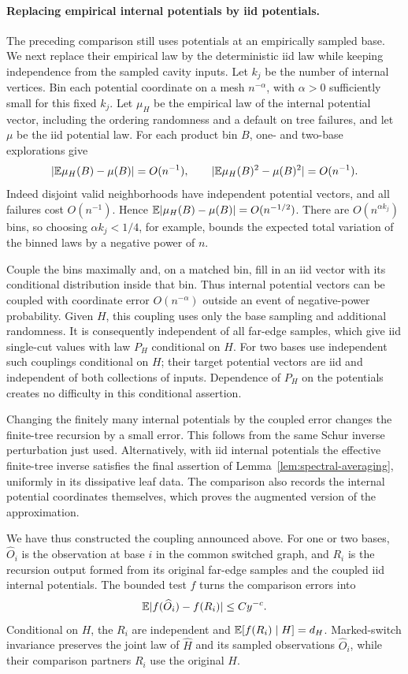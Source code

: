 \paragraph{Replacing empirical internal potentials by iid potentials.}
The preceding comparison still uses potentials at an empirically
sampled base.  We next replace their empirical law by the deterministic
iid law while keeping independence from the sampled cavity inputs.
Let $k_j$ be the number of internal vertices.  Bin each potential
coordinate on a mesh $n^{-\alpha}$, with $\alpha>0$ sufficiently small
for this fixed $k_j$.  Let $\mu_H$ be the empirical law of the internal
potential vector, including the ordering randomness and a default on
tree failures, and let $\mu$ be the iid potential law.
For each product bin $B$, one- and two-base explorations give
\[
 |\mathbb E\mu_H(B)-\mu(B)|=O(n^{-1}),\qquad
 |\mathbb E\mu_H(B)^2-\mu(B)^2|=O(n^{-1}).
\]
Indeed disjoint valid neighborhoods have independent potential vectors,
and all failures cost $O(n^{-1})$.  Hence
$\mathbb E|\mu_H(B)-\mu(B)|=O(n^{-1/2})$.
There are $O(n^{\alpha k_j})$ bins, so choosing
$\alpha k_j<1/4$, for example, bounds the expected total variation
of the binned laws by a negative power of $n$.

Couple the bins maximally and, on a matched bin, fill in an iid vector
with its conditional distribution inside that bin.  Thus internal
potential vectors can be coupled with coordinate error $O(n^{-\alpha})$
outside an event of negative-power probability.  Given $H$, this
coupling uses only the base sampling and additional randomness.  It
is consequently independent of all far-edge samples, which give iid
single-cut values with law $P_H$ conditional on $H$.  For two bases
use independent such couplings conditional on $H$; their target
potential vectors are iid and independent of both collections of
inputs.  Dependence of $P_H$ on the potentials creates no difficulty
in this conditional assertion.

Changing the finitely many internal potentials by the coupled error
changes the finite-tree recursion by a small error.  This follows
from the same Schur inverse perturbation just used.  Alternatively,
with iid internal potentials the effective finite-tree inverse
satisfies the final assertion of Lemma~\ref{lem:spectral-averaging},
uniformly in its dissipative leaf data.  The comparison also records
the internal potential coordinates themselves, which proves the
augmented version of the approximation.

We have thus constructed the coupling announced above.  For one or
two bases, $\widehat O_i$ is the observation at base $i$ in the common
switched graph, and $R_i$ is the recursion output formed from its
original far-edge samples and the coupled iid internal potentials.
The bounded test $f$ turns the comparison errors into
\begin{equation}\label{eq:switched-observation-comparison}
 \mathbb E|f(\widehat O_i)-f(R_i)|\le Cy^{-c}.
\end{equation}
Conditional on $H$, the $R_i$ are independent and
$\mathbb E[f(R_i)\mid H]=d_H$.  Marked-switch invariance preserves the
joint law of $\widehat H$ and its sampled observations
$\widehat O_i$, while their comparison partners $R_i$ use the original $H$.

